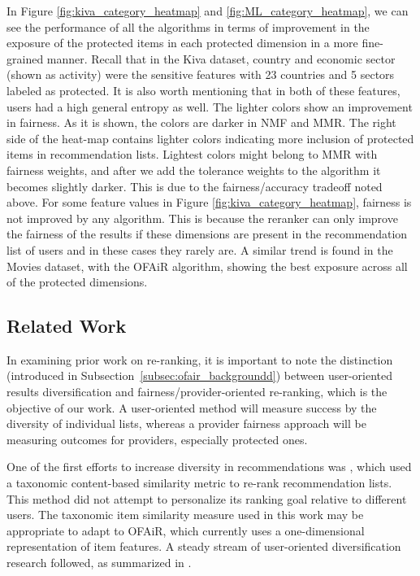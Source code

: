 In Figure \ref{fig:kiva_category_heatmap} and \ref{fig:ML_category_heatmap}, we can see the performance of all the algorithms in terms of improvement in the exposure of the protected items in each protected dimension in a more fine-grained manner. Recall that in the Kiva dataset, country and economic sector (shown as activity) were the sensitive features with 23 countries and 5 sectors labeled as protected. It is also worth mentioning that in both of these features, users had a high general entropy as well. The lighter colors show an improvement in fairness. As it is shown, the colors are darker in NMF and MMR. The right side of the heat-map contains lighter colors indicating more inclusion of protected items in recommendation lists. Lightest colors might belong to MMR with fairness weights, and after we add the tolerance weights to the algorithm it becomes slightly darker. This is due to the fairness/accuracy tradeoff noted above. For some feature values in Figure \ref{fig:kiva_category_heatmap}, fairness is not improved by any algorithm. This is because the reranker can only improve the fairness of the results if these dimensions are present in the recommendation list of users and in these cases they rarely are. A similar trend is found in the Movies dataset, with the OFAiR algorithm, showing the best exposure across all of the protected dimensions. 


\subsection{Related Work}
\label{subsec:ofair_related_work}

In examining prior work on re-ranking, it is important to note the distinction (introduced in Subsection~\ref{subsec:ofair_backgroundd}) between user-oriented results diversification and fairness/provider-oriented re-ranking, which is the objective of our work. A user-oriented method will measure success by the diversity of individual lists, whereas a provider fairness approach will be measuring outcomes for providers, especially protected ones.

One of the first efforts to increase diversity in recommendations was \cite{Ziegler:2005:IRL:1060745.1060754}, which used a taxonomic content-based similarity metric to re-rank recommendation lists. This method did not attempt to personalize its ranking goal relative to different users. The taxonomic item similarity measure used in this work may be appropriate to adapt to OFAiR, which currently uses a one-dimensional representation of item features. A steady stream of user-oriented diversification research followed, as summarized in \cite{kunaver2017diversity}.

